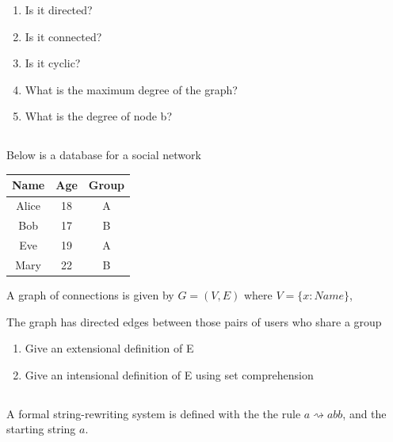 \documentclass[twocolumn]{article}
\begin{document}
    \begin{enumerate}
        \item Is it directed?
        \item Is it connected?
        \item Is it cyclic?
        \item What is the maximum degree of the graph?
        \item What is the degree of node b?
    \end{enumerate}

\subsection{}

    Below is a database for a social network

    \begin{table}[h!]
        \centering
        \begin{tabular}{c | c | c }
            \toprule
            Name & Age & Group \\
            \midrule
            Alice & 18 & A  \\
            Bob & 17 & B  \\
            Eve & 19 & A \\
            Mary & 22 & B \\
            \bottomrule
        \end{tabular}
    \end{table}

    A graph of connections is given by $ G = ( V, E)$ where $ V = \{ x : Name \}$, %

    The graph has directed edges between those pairs of users who share a group

    \begin{enumerate}
        \item Give an extensional definition of E
        \item Give an intensional definition of E using set comprehension
    \end{enumerate}

\subsection{}

    A formal string-rewriting system is defined with the the rule $ a \rightsquigarrow abb $, and the starting string $a$.
    
\end{document}
